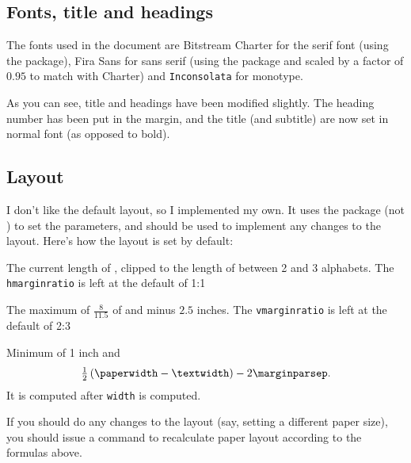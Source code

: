 \documentclass{notes}
\begin{document}
\subsection{Fonts, title and headings} \label{fonts}

The fonts used in the document are Bitstream Charter for the serif font (using the  package), \textsf{Fira Sans} for sans serif (using the  package and scaled by a factor of $0.95$ to match with Charter) and \texttt{Inconsolata} for monotype.

As you can see, title and headings have been modified slightly. The heading number has been put in the margin, and the title (and subtitle) are now set in normal font (as opposed to bold).

\subsection{Layout} 

I don't like the default  layout, so I implemented my own. It uses the  package (not ) to set the parameters, and \alert{ should be used to implement any changes to the layout}. Here's how the layout is set by default:
\begin{description}[font=\ttfamily, labelindent=1em]
    \item[width] The current length of , clipped to the length of between 2 and 3 alphabets. The \texttt{hmarginratio} is left at the default of 1:1
    
    \item[height] The maximum of $\frac{8}{11.5}$ of  and  minus $2.5$ inches. The \texttt{vmarginratio} is left at the default of 2:3
    
    \item[marginparwidth] Minimum of 1 inch and 
    \begin{equation*}
        \tfrac{1}{2}\left({\texttt{\textbackslash{}paperwidth}}-{\texttt{\textbackslash{}textwidth}}\right) - 2{\texttt{\textbackslash{}marginparsep}}.
    \end{equation*}
    It is computed after \texttt{width} is computed.
\end{description}

If you should do any changes to the layout (say, setting a different paper size), you should issue a  command to recalculate paper layout according to the formulas above. 
\end{document}
